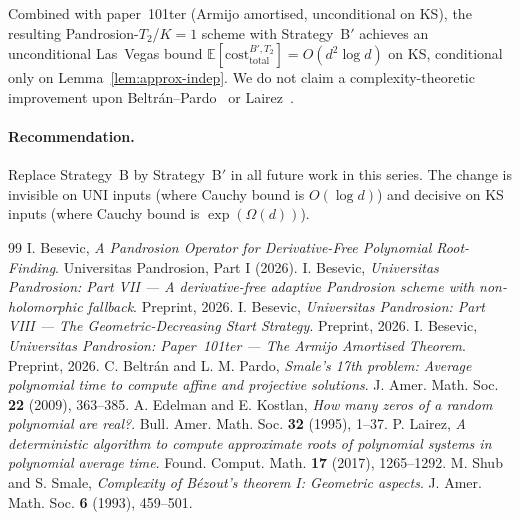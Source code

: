 \documentclass[11pt,a4paper]{article}
\begin{document}
Combined with paper~101ter (Armijo amortised, unconditional on KS), the resulting Pandrosion-$T_2$/$K{=}1$ scheme with Strategy~B$'$ achieves an unconditional Las~Vegas bound $\mathbb{E}[\mathrm{cost}^{B',T_2}_{\text{total}}] = O(d^{2}\log d)$ on KS, conditional only on Lemma~\ref{lem:approx-indep}. We do not claim a complexity-theoretic improvement upon Beltr\'an--Pardo~\cite{beltranpardo} or Lairez~\cite{lairez}.

\paragraph{Recommendation.} Replace Strategy~B by Strategy~B$'$ in all future work in this series. The change is invisible on UNI inputs (where Cauchy bound is $O(\log d)$) and decisive on KS inputs (where Cauchy bound is $\exp(\Omega(d))$).

\begin{thebibliography}{99}
 I. Besevic, \textit{A Pandrosion Operator for Derivative-Free Polynomial Root-Finding}. Universitas Pandrosion, Part I (2026).
 I. Besevic, \textit{Universitas Pandrosion: Part VII --- A derivative-free adaptive Pandrosion scheme with non-holomorphic fallback}. Preprint, 2026.
 I. Besevic, \textit{Universitas Pandrosion: Part VIII --- The Geometric-Decreasing Start Strategy}. Preprint, 2026.
 I. Besevic, \textit{Universitas Pandrosion: Paper~101ter --- The Armijo Amortised Theorem}. Preprint, 2026.
 C. Beltr\'an and L. M. Pardo, \textit{Smale's 17th problem: Average polynomial time to compute affine and projective solutions}. J. Amer. Math. Soc. \textbf{22} (2009), 363--385.
 A. Edelman and E. Kostlan, \textit{How many zeros of a random polynomial are real?}. Bull. Amer. Math. Soc. \textbf{32} (1995), 1--37.
 P. Lairez, \textit{A deterministic algorithm to compute approximate roots of polynomial systems in polynomial average time}. Found. Comput. Math. \textbf{17} (2017), 1265--1292.
 M. Shub and S. Smale, \textit{Complexity of B\'ezout's theorem I: Geometric aspects}. J. Amer. Math. Soc. \textbf{6} (1993), 459--501.
\end{thebibliography}
\end{document}
